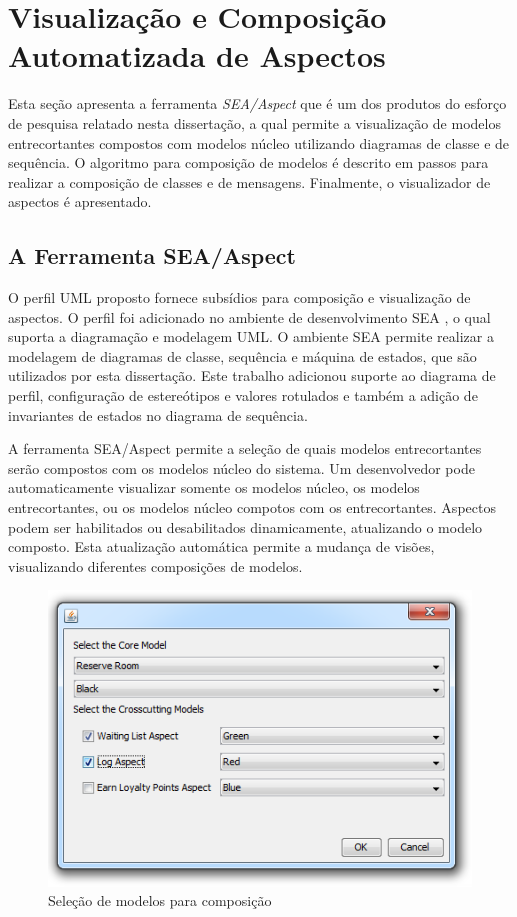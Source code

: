 \section{Visualização e Composição Automatizada de Aspectos}

Esta seção apresenta a ferramenta \textit{SEA/Aspect} que é um dos produtos do esforço de pesquisa relatado nesta dissertação, a qual permite a
visualização de modelos entrecortantes compostos com modelos núcleo utilizando diagramas de classe e de sequência. O algoritmo para composição de 
modelos é descrito em passos para realizar a composição de classes e de mensagens. Finalmente, o visualizador de aspectos é apresentado.

\subsection{A Ferramenta SEA/Aspect}

O perfil UML proposto fornece subsídios para composição e visualização de aspectos. O perfil foi adicionado no ambiente de desenvolvimento
SEA \cite{silva:00}, o qual suporta a diagramação e modelagem UML. O ambiente SEA permite realizar a modelagem de diagramas de classe, sequência e
máquina de estados, que são utilizados por esta dissertação. Este trabalho adicionou suporte ao diagrama de perfil, configuração de estereótipos e
valores rotulados e também a adição de invariantes de estados no diagrama de sequência. 

A ferramenta SEA/Aspect permite a seleção de quais modelos entrecortantes serão compostos com os modelos núcleo do sistema. Um desenvolvedor pode
automaticamente visualizar somente os modelos núcleo, os modelos entrecortantes, ou os modelos núcleo compotos com os entrecortantes. Aspectos podem ser 
habilitados ou desabilitados dinamicamente, atualizando o modelo composto. Esta atualização automática permite a mudança de visões, visualizando
diferentes composições de modelos.

  \begin{figure}[!h]
	\centering
	\includegraphics{img/selection_screen.png}
	\caption{Seleção de modelos para composição}\label{fig:selection_screen}
  \end{figure}

